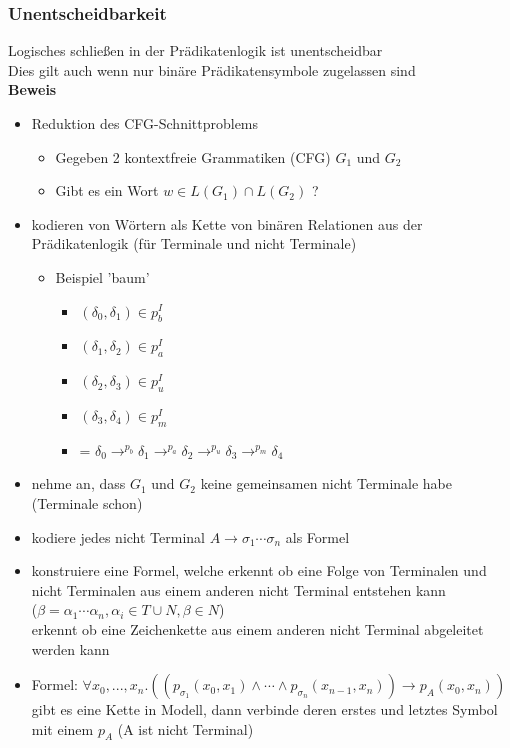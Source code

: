 \documentclass[12pt,a4paper]{article}
\begin{document}
\subsubsection{Unentscheidbarkeit}
Logisches schließen in der Prädikatenlogik ist unentscheidbar\\
Dies gilt auch wenn nur binäre Prädikatensymbole zugelassen sind\\
\textbf{Beweis}\\
\begin{itemize}
\item Reduktion des CFG-Schnittproblems
\begin{itemize}
\item Gegeben 2 kontextfreie Grammatiken (CFG) $G_1$ und $G_2$
\item Gibt es ein Wort $w \in L(G_1) \cap L(G_2)$ ?
\end{itemize}
\item kodieren von Wörtern als Kette von binären Relationen aus der Prädikatenlogik (für Terminale und nicht Terminale)
\begin{itemize}
\item Beispiel 'baum'
\begin{itemize}
\item $(\delta_0, \delta_1) \in p_b^I$
\item $(\delta_1, \delta_2) \in p_a^I$
\item $(\delta_2, \delta_3) \in p_u^I$
\item $(\delta_3, \delta_4) \in p_m^I$
\item = $\delta_0 \rightarrow^{p_b} \delta_1 \rightarrow^{p_a} \delta_2 \rightarrow^{p_u} \delta_3 \rightarrow^{p_m} \delta_4$
\end{itemize}
\end{itemize}
\item nehme an, dass $G_1$ und $G_2$ keine gemeinsamen nicht Terminale habe (Terminale schon)
\item kodiere jedes nicht Terminal $A \rightarrow \sigma_1\cdots\sigma_n$ als Formel
\item konstruiere eine Formel, welche erkennt ob eine Folge von Terminalen und nicht Terminalen aus einem anderen nicht Terminal entstehen kann\\
($\beta = \alpha_1\cdots\alpha_n, \alpha_i \in T\cup N, \beta \in N$)\\
erkennt ob eine Zeichenkette aus einem anderen nicht Terminal abgeleitet werden kann
\item Formel: $\forall x_0,...,x_n.((p_{\sigma_1}(x_0,x_1)\land \cdots \land p_{\sigma_n}(x_{n-1},x_n)) \rightarrow p_A(x_0,x_n))$ gibt es eine Kette in Modell, dann verbinde deren erstes und letztes Symbol mit einem $p_A$ (A ist nicht Terminal)

\end{itemize}
\end{document}
